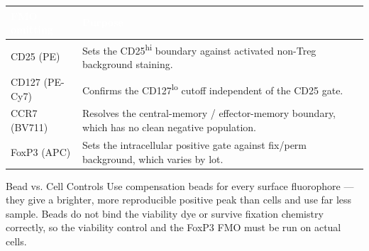 \vspace{4pt}
\begin{center}
\renewcommand{\arraystretch}{1.2}
\begin{tabularx}{\linewidth}{@{}L{2.3cm}X@{}}
\toprule
{}
\textcolor{white}{\textbf{FMO omitting}} & \textcolor{white}{\textbf{Purpose}} \\
\midrule
CD25 (PE) & Sets the CD25\textsuperscript{hi} boundary against activated non-Treg background staining. \\
CD127 (PE-Cy7) & Confirms the CD127\textsuperscript{lo} cutoff independent of the CD25 gate. \\
CCR7 (BV711) & Resolves the central-memory / effector-memory boundary, which has no clean negative population. \\
FoxP3 (APC) & Sets the intracellular positive gate against fix/perm background, which varies by lot. \\
\bottomrule
\end{tabularx}
\end{center}

\vspace{6pt}
\begin{qcbox}{Bead vs. Cell Controls}
Use compensation beads for every surface fluorophore --- they give a
brighter, more reproducible positive peak than cells and use far less
sample. Beads do not bind the viability dye or survive fixation chemistry
correctly, so the viability control and the FoxP3 FMO must be run on actual
cells.
\end{qcbox}
